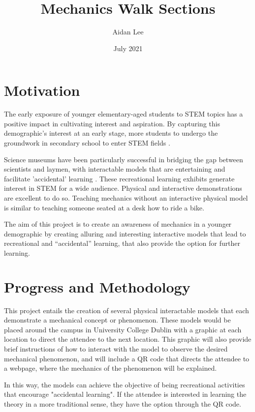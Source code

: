 \documentclass[12pt, a4paper]{article}
\title{Mechanics Walk Sections}
\author{Aidan Lee}
\date{July 2021}
\begin{document}
\maketitle
\section{Motivation}

The early exposure of younger elementary-aged students to STEM topics has a positive impact in cultivating interest and aspiration. By capturing this demographic's interest at an early stage, more students to undergo the groundwork in secondary school to enter STEM fields \cite{dejarnette_americas_2012}.

Science museums have been particularly successful in bridging the gap between scientists and laymen, with interactable models that are entertaining and facilitate 'accidental' learning \cite{tressel_role_1980}. These recreational learning exhibits generate interest in STEM for a wide audience. Physical and interactive demonstrations are excellent to do so. Teaching mechanics without an interactive physical model is similar to teaching someone seated at a desk how to ride a bike.

The aim of this project is to create an awareness of mechanics in a younger demographic by creating alluring and interesting interactive models that lead to recreational and ``accidental'' learning, that also provide the option for further learning.


\section{Progress and Methodology}
This project entails the creation of several physical interactable models that each demonstrate a mechanical concept or phenomenon. These models would be placed around the campus in University College Dublin with a graphic at each location to direct the attendee to the next location. This graphic will also provide brief instructions of how to interact with the model to observe the desired mechanical phenomenon, and will include a QR code that directs the attendee to a webpage, where the mechanics of the phenomenon will be explained.

In this way, the models can achieve the objective of being recreational activities that encourage "accidental learning". If the attendee is interested in learning the theory in a more traditional sense, they have the option through the QR code.
\end{document}
